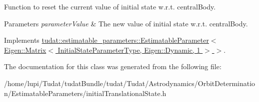 Function to reset the current value of initial state w.\+r.\+t. central\+Body. 
\begin{DoxyParams}{Parameters}
{\em parameter\+Value} & The new value of initial state w.\+r.\+t. central\+Body. \\
\hline
\end{DoxyParams}


Implements \hyperlink{classtudat_1_1estimatable__parameters_1_1EstimatableParameter_a5df35bde257a6db401ca3c3613056554}{tudat\+::estimatable\+\_\+parameters\+::\+Estimatable\+Parameter$<$ Eigen\+::\+Matrix$<$ Initial\+State\+Parameter\+Type, Eigen\+::\+Dynamic, 1 $>$ $>$}.



The documentation for this class was generated from the following file\+:\begin{DoxyCompactItemize}
\item 
/home/lupi/\+Tudat/tudat\+Bundle/tudat/\+Tudat/\+Astrodynamics/\+Orbit\+Determination/\+Estimatable\+Parameters/initial\+Translational\+State.\+h\end{DoxyCompactItemize}
